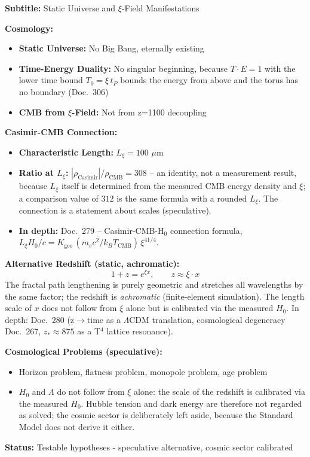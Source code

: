 	\begin{documentbox}
		\textbf{Subtitle:} Static Universe and $\xi$-Field Manifestations
		
		\textbf{Cosmology:}
		\begin{itemize}
			\item \textbf{Static Universe:} No Big Bang, eternally existing
			\item \textbf{Time-Energy Duality:} No singular beginning, because $T\cdot E = 1$ with the lower time bound $T_0 = \xi\,t_P$ bounds the energy from above and the torus has no boundary (Doc.~306)
			\item \textbf{CMB from $\xi$-Field:} Not from z=1100 decoupling
		\end{itemize}
		
		\textbf{Casimir-CMB Connection:}
		\begin{itemize}
			\item \textbf{Characteristic Length:} $L_\xi = 100$ $\mu$m
			\item \textbf{Ratio at $L_\xi$:} $|\rho_{\text{Casimir}}|/\rho_{\text{CMB}} = 308$ -- an identity, not a measurement result, because $L_\xi$ itself is determined from the measured CMB energy density and $\xi$; a comparison value of $312$ is the same formula with a rounded $L_\xi$. The connection is a statement about scales (speculative).
			\item \textbf{In depth:} Doc.~279 -- Casimir-CMB-H$_0$ connection formula, $L_\xi H_0/c = K_{\text{geo}}\,(m_e c^2/k_B T_{\text{CMB}})\,\xi^{41/4}$.
		\end{itemize}
		
		\textbf{Alternative Redshift (static, achromatic):}
		\begin{equation}
			1+z = e^{\xi x}, \qquad z \approx \xi \cdot x
		\end{equation}
		The fractal path lengthening is purely geometric and stretches all
		wavelengths by the same factor; the redshift is \emph{achromatic}
		(finite-element simulation). The length scale of $x$ does not follow from $\xi$
		alone but is calibrated via the measured $H_0$. In depth:
		Doc.~280 (z$\to$time as a $\Lambda$CDM translation, cosmological degeneracy
		Doc.~267, $z_*\approx 875$ as a T$^4$ lattice resonance).
		
		\textbf{Cosmological Problems (speculative):}
		\begin{itemize}
			\item Horizon problem, flatness problem, monopole problem, age problem
			\item $H_0$ and $\Lambda$ do not follow from $\xi$ alone: the scale of the redshift is calibrated via the measured $H_0$. Hubble tension and dark energy are therefore not regarded as solved; the cosmic sector is deliberately left aside, because the Standard Model does not derive it either.
		\end{itemize}
		
		\textbf{Status:} Testable hypotheses - speculative alternative, cosmic sector calibrated
	\end{documentbox}
	
